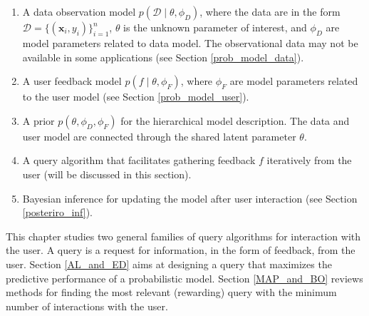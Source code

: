 \documentclass[dissertation,math,vertlayout,pdfa,colorlinks]{aaltoseries}
\newcommand{\bD}{\mathcal{D}}
\begin{document}
\begin{enumerate}
	\item A data observation model $p(\bD \mid \! \theta,\phi_D)$, where the data are in the form $\bD= \{(\bm{x}_i,y_i)\}_{i=1}^{n}$, $\theta$ is the unknown parameter of interest, and $\phi_D$ are model parameters related to data model. The observational data may not be available in some applications (see Section \ref{prob_model_data}). 
	\item A user feedback model $p(f\mid \theta, \phi_F)$, where $\phi_F$ are model parameters related to the user model (see Section \ref{prob_model_user}).
	\item A prior $p(\theta, \phi_D, \phi_F)$ for the hierarchical model description. The data and user model are connected through the shared latent parameter $\theta$.
	\item A query algorithm that facilitates gathering feedback $f$ iteratively from the user (will be discussed in this section).
	\item Bayesian inference for updating the model after user interaction (see Section \ref{posteriro_inf}).
\end{enumerate}

This chapter studies two general families of query algorithms for interaction with the user. A query is a request for information, in the form of feedback, from the user. Section \ref{AL_and_ED} aims at designing a query that maximizes the predictive performance of a probabilistic model. Section \ref{MAP_and_BO} reviews methods for finding the most relevant (rewarding) query with the minimum number of interactions with the user. 
\end{document}
